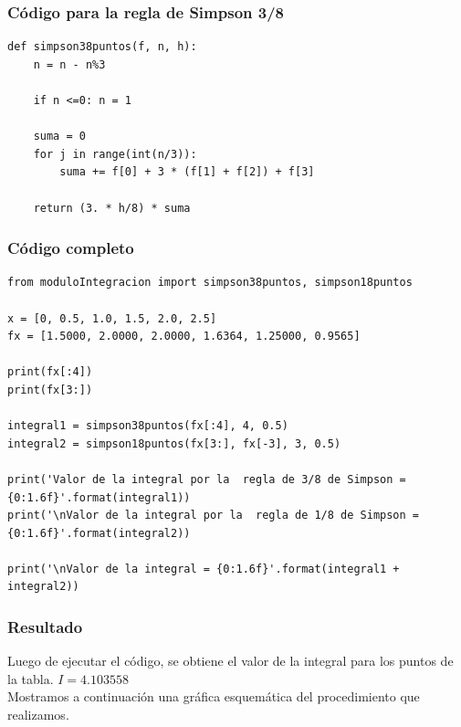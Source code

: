 \documentclass[12pt]{beamer}
\begin{document}
\begin{frame}
\frametitle{Código para la regla de Simpson 3/8}
\begin{lstlisting}[caption=Regla de Simpson de 3/8 para obtener la integral por pares de puntos]
def simpson38puntos(f, n, h):
	n = n - n%3

	if n <=0: n = 1

	suma = 0
	for j in range(int(n/3)):
		suma += f[0] + 3 * (f[1] + f[2]) + f[3]

	return (3. * h/8) * suma
\end{lstlisting}
\end{frame}
\begin{frame}
\frametitle{Código completo}
\begin{lstlisting}[caption=Código completo  para el ejercicio]
from moduloIntegracion import simpson38puntos, simpson18puntos

x = [0, 0.5, 1.0, 1.5, 2.0, 2.5]
fx = [1.5000, 2.0000, 2.0000, 1.6364, 1.25000, 0.9565]

print(fx[:4])
print(fx[3:])

integral1 = simpson38puntos(fx[:4], 4, 0.5)
integral2 = simpson18puntos(fx[3:], fx[-3], 3, 0.5)

print('Valor de la integral por la  regla de 3/8 de Simpson = {0:1.6f}'.format(integral1))
print('\nValor de la integral por la  regla de 1/8 de Simpson = {0:1.6f}'.format(integral2))

print('\nValor de la integral = {0:1.6f}'.format(integral1 + integral2))
\end{lstlisting}
\end{frame}
\begin{frame}
\frametitle{Resultado}
Luego de ejecutar el código, se obtiene el valor de la integral para los puntos de la tabla. \pause $ I = 4.103558$
\\
\bigskip
\pause
Mostramos a continuación una gráfica esquemática del procedimiento que realizamos.
\end{frame}
\end{document}
